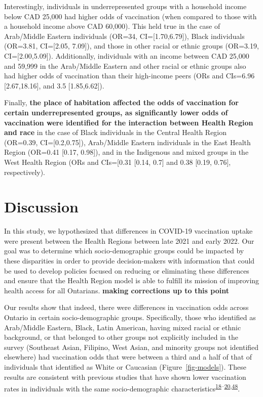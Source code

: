 \documentclass[
]{article}
\begin{document}
Interestingly, individuals in underrepresented groups with a household
income below CAD 25,000 had higher odds of vaccination (when compared to
those with a household income above CAD 60,000). This held true in the
case of Arab/Middle Eastern individuals (OR=34, CI={[}1.70,6.79{]}),
Black individuals (OR=3.81, CI={[}2.05, 7.09{]}), and those in other
racial or ethnic groups (OR=3.19, CI={[}2.00,5.09{]}). Additionally,
individuals with an income between CAD 25,000 and 59,999 in the
Arab/Middle Eastern and other racial or ethnic groups also had higher
odds of vaccination than their high-income peers (ORs and CIs=6.96
{[}2.67,18.16{]}, and 3.5 {[}1.85,6.62{]}).

Finally, \textbf{the place of habitation affected the odds of
vaccination for certain underrepresented groups, as significantly lower
odds of vaccination were identified for the interaction between Health
Region and race} in the case of Black individuals in the Central Health
Region (OR=0.39, CI={[}0.2,0.75{]}), Arab/Middle Eastern individuals in
the East Health Region (OR=0.41 {[}0.17, 0.98{]}), and in the Indigenous
and mixed groups in the West Health Region (ORs and CIs={[}0.31 {[}0.14,
0.7{]} and 0.38 {[}0.19, 0.76{]}, respectively).

\hypertarget{discussion}{%
\section{Discussion}\label{discussion}}

In this study, we hypothesized that differences in COVID-19 vaccination
uptake were present between the Health Regions between late 2021 and
early 2022. Our goal was to determine which socio-demographic groups
could be impacted by these disparities in order to provide
decision-makers with information that could be used to develop policies
focused on reducing or eliminating these differences and ensure that the
Health Region model is able to fulfill its mission of improving health
access for all Ontarians. \textbf{making corrections up to this point}

Our results show that indeed, there were differences in vaccination odds
across Ontario in certain socio-demographic groups. Specifically, those
who identified as Arab/Middle Eastern, Black, Latin American, having
mixed racial or ethnic background, or that belonged to other groups not
explicitly included in the survey (Southeast Asian, Filipino, West
Asian, and minority groups not identified elsewhere) had vaccination
odds that were between a third and a half of that of individuals that
identified as White or Caucasian (Figure~\ref{fig-models}). These
results are consistent with previous studies that have shown lower
vaccination rates in individuals with the same socio-demographic
characteristics\textsuperscript{\protect\hyperlink{ref-guay2022}{18}--\protect\hyperlink{ref-hussain2022}{20},\protect\hyperlink{ref-carter2022}{48}}.
\end{document}
